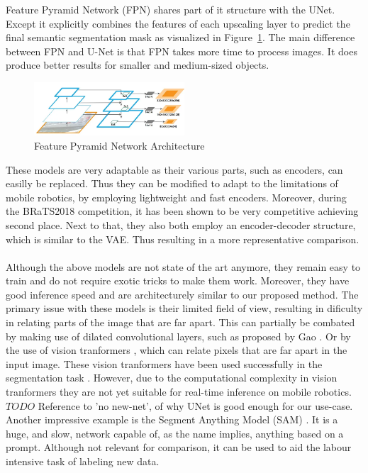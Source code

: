 Feature Pyramid Network (FPN) \cite{lin2017feature} shares part of it structure with the UNet. Except it explicitly combines the features of each upscaling layer to predict the final semantic segmentation mask as visualized in Figure~\ref{fig:fpn-architecture}. The main difference between FPN and U-Net is that FPN takes more time to process images. It does produce better results for smaller and medium-sized objects.

\begin{figure}[ht]
    \centering
    \includegraphics[width=0.5\textwidth]{figures/fpn-architecture.png}
    \caption{Feature Pyramid Network Architecture \cite{lin2017feature}}
    \label{fig:fpn-architecture}
\end{figure}

These models are very adaptable as their various parts, such as encoders, can easilly be replaced. Thus they can be modified to adapt to the limitations of mobile robotics, by employing lightweight and fast encoders. Moreover, during the BRaTS2018 \cite{menze2014multimodal} competition, it has been shown to be very competitive achieving second place\cite{DBLP:journals/corr/abs-1809-10483}. Next to that, they also both employ an encoder-decoder structure, which is similar to the VAE. Thus resulting in a more representative comparison.

\paragraph{}
Although the above models are not state of the art anymore, they remain easy to train and do not require exotic tricks to make them work. Moreover, they have good inference speed and are architecturely similar to our proposed method. The primary issue with these models is their limited field of view, resulting in dificulty in relating parts of the image that are far apart. This can partially be combated by making use of dilated convolutional layers, such as proposed by Gao \cite{gao2023rethinking}. Or by the use of vision tranformers \cite{dosovitskiy2021image}, which can relate pixels that are far apart in the input image. These vision tranformers have been used successfully in the segmentation task \cite{xie2021segformer,chen2022vision}. However, due to the computational complexity in vision tranformers they are not yet suitable for real-time inference on mobile robotics. $TODO$ Reference to 'no new-net', of why UNet is good enough for our use-case.
Another impressive example is the Segment Anything Model (SAM) \cite{kirillov2023segment}. It is a huge, and slow, network capable of, as the name implies, anything based on a prompt. Although not relevant for comparison, it can be used to aid the labour intensive task of labeling new data.
